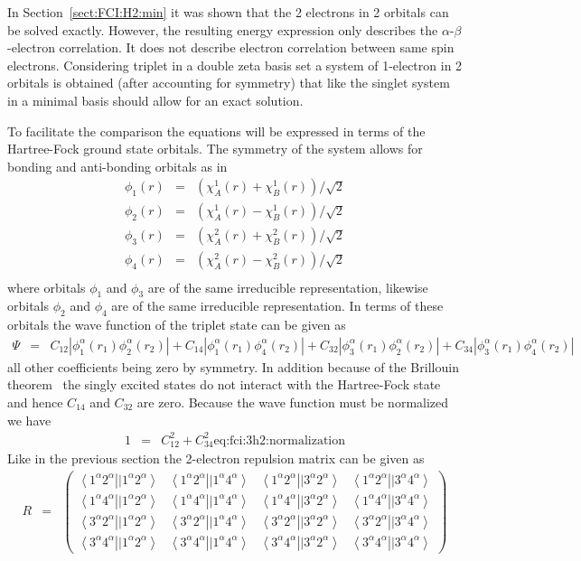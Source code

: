 \documentclass[pra,nofootinbib]{revtex4-1}
\newcommand{\erib}[4]{\left\langle #1^\alpha #2^\alpha \right.\left|| #3^\alpha #4^\alpha \right\rangle}
\newcommand{\dlabel}[1]{\text{#1}\label{#1}}
\begin{document}
In Section~\ref{sect:FCI:H2:min} it was shown that the 2 electrons in 2 orbitals can be solved exactly.
However, the resulting energy expression only describes the $\alpha$-$\beta$-electron correlation. It 
does not describe electron correlation between same spin electrons. Considering triplet  in 
a double zeta basis set a system of 1-electron in 2 orbitals is obtained (after accounting for symmetry)
that like the singlet system in a minimal basis should allow for an exact solution.

To facilitate the comparison the equations will be expressed in terms of the Hartree-Fock ground state
orbitals. The symmetry of the system allows for bonding and anti-bonding orbitals as in
\begin{eqnarray}
   \phi_1(r) &=& (\chi_A^1(r)+\chi_B^1(r))/\sqrt{2} \\
   \phi_2(r) &=& (\chi_A^1(r)-\chi_B^1(r))/\sqrt{2} \\
   \phi_3(r) &=& (\chi_A^2(r)+\chi_B^2(r))/\sqrt{2} \\
   \phi_4(r) &=& (\chi_A^2(r)-\chi_B^2(r))/\sqrt{2} \\
\end{eqnarray}
where orbitals $\phi_1$ and $\phi_3$ are of the same irreducible representation, likewise
orbitals $\phi_2$ and $\phi_4$ are of the same irreducible representation.
In terms of these orbitals the wave function of the triplet state can be given as
\begin{eqnarray}
  \Psi &=& C_{12}|\phi^\alpha_1(r_1)\phi^\alpha_2(r_2)|
        +  C_{14}|\phi^\alpha_1(r_1)\phi^\alpha_4(r_2)|
        +  C_{32}|\phi^\alpha_3(r_1)\phi^\alpha_2(r_2)|
        +  C_{34}|\phi^\alpha_3(r_1)\phi^\alpha_4(r_2)|
\end{eqnarray}
all other coefficients being zero by symmetry.
In addition because of the Brillouin theorem~\cite{Surj_n_1989} the singly excited states do not interact
with the Hartree-Fock state and hence $C_{14}$ and $C_{32}$ are zero.
Because the wave function must be normalized we have
\begin{eqnarray}
  1 &=& C_{12}^2 + C_{34}^2
  \dlabel{eq:fci:3h2:normalization}
\end{eqnarray}
Like in the previous section the 2-electron repulsion matrix can be given as
\begin{eqnarray}
  R &=& 
  \begin{pmatrix}
  \erib{1}{2}{1}{2} & \erib{1}{2}{1}{4} & \erib{1}{2}{3}{2} & \erib{1}{2}{3}{4} \\
  \erib{1}{4}{1}{2} & \erib{1}{4}{1}{4} & \erib{1}{4}{3}{2} & \erib{1}{4}{3}{4} \\
  \erib{3}{2}{1}{2} & \erib{3}{2}{1}{4} & \erib{3}{2}{3}{2} & \erib{3}{2}{3}{4} \\
  \erib{3}{4}{1}{2} & \erib{3}{4}{1}{4} & \erib{3}{4}{3}{2} & \erib{3}{4}{3}{4} 
  \end{pmatrix}
\end{eqnarray}
\end{document}

